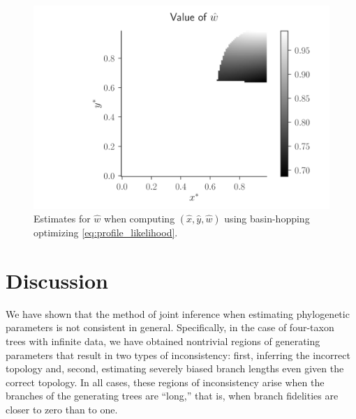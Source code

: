 \documentclass{article}
\begin{document}
\begin{figure}
\centering
\includegraphics[width=\textwidth]{w-hat-empirical-01}
\caption{
    Estimates for $\hat{w}$ when computing $(\hat{x}, \hat{y}, \hat{w})$ using basin-hopping \cite{Wales1997} optimizing \eqref{eq:profile_likelihood}.
}
\label{fig:bl-general-inconsistency}
\end{figure}

\section*{Discussion}

We have shown that the method of joint inference when estimating phylogenetic parameters is not consistent in general.
Specifically, in the case of four-taxon trees with infinite data, we have obtained nontrivial regions of generating parameters that result in two types of inconsistency: first, inferring the incorrect topology and, second, estimating severely biased branch lengths even given the correct topology.
In all cases, these regions of inconsistency arise when the branches of the generating trees are ``long,'' that is, when branch fidelities are closer to zero than to one.
\end{document}
